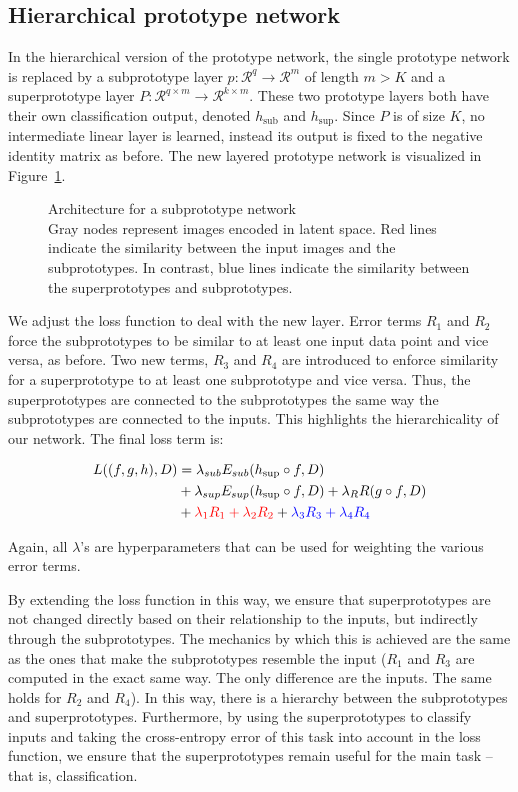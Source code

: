 \subsection{Hierarchical prototype network}
In the hierarchical version of the prototype network, the single prototype network is replaced by a subprototype layer $p : \mathcal{R}^q\rightarrow \mathcal{R}^m$ of length $m > K$ and a superprototype layer $P:\mathcal{R}^{q\times m}\rightarrow\mathcal{R}^{k\times m}$. These two prototype layers both have their own classification output, denoted $h_{\text{sub}}$ and $h_{\text{sup}}$. Since $P$ is of size $K$, no intermediate linear layer is learned, instead its output is fixed to the negative identity matrix as before. The new layered prototype network is visualized in Figure~\ref{fig:hierarchical}. 
\begin{figure}[bh]
    \centering
    
    \caption{Architecture for a subprototype network\\ {\normalfont Gray nodes represent images encoded in latent space. {\color{red} Red} lines indicate the similarity between the input images and the subprototypes. In contrast, {\color{blue} blue} lines indicate the similarity between the superprototypes and subprototypes.}}
    \label{fig:hierarchical}
\end{figure}

We adjust the loss function to deal with the new layer. Error terms $R_1$ and $R_2$ force the subprototypes to be similar to at least one input data point and vice versa, as before. Two new terms, $R_3$ and $R_4$ are introduced to enforce similarity for a superprototype to at least one subprototype and vice versa. Thus, the superprototypes are connected to the subprototypes the same way the subprototypes are connected to the inputs. This highlights the hierarchicality of our network. The final loss term is:

\begin{align*}
    L((f,g,h),D) &= \lambda_{sub} E_{sub}(h_{\text{sup}} \circ f, D)\\ &+ \lambda_{sup} E_{sup}(h_{\text{sup}} \circ f, D) 
    + \lambda_R R(g \circ f,D)\\ &+ {\color{red}\lambda_1 R_1 + \lambda_2 R_2}  + {\color{blue}\lambda_3 R_3 + \lambda_4 R_4}
\end{align*}

Again, all $\lambda$'s are hyperparameters that can be used for weighting the various error terms.

By extending the loss function in this way, we ensure that superprototypes are not changed directly based on their relationship to the inputs, but indirectly through the subprototypes. The mechanics by which this is achieved are the same as the ones that make the subprototypes resemble the input ($R_1$ and $R_3$ are computed in the exact same way. The only difference are the inputs. The same holds for $R_2$ and $R_4$). In this way, there is a hierarchy between the subprototypes and superprototypes. Furthermore, by using the superprototypes to classify inputs and taking the cross-entropy error of this task into account in the loss function, we ensure that the superprototypes remain useful for the main task -- that is, classification. 

